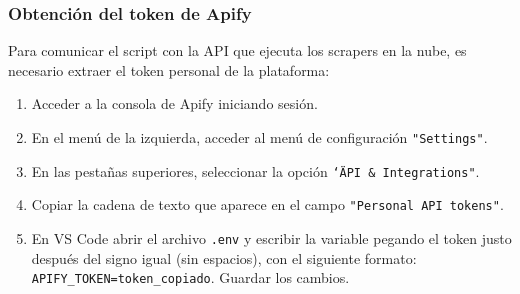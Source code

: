\subsubsection{Obtención del token de Apify}
Para comunicar el script con la API que ejecuta los scrapers en la nube, es necesario extraer el token personal de la plataforma:
\begin{enumerate}
    \item Acceder a la consola de Apify iniciando sesión.
    \item En el menú de la izquierda, acceder al menú de configuración \texttt{"Settings"}.
    \item En las pestañas superiores, seleccionar la opción \texttt{\char`\"API \& Integrations"}.
    \item Copiar la cadena de texto que aparece en el campo \texttt{"Personal API tokens"}.
    \item En VS Code abrir el archivo \texttt{.env} y escribir la variable pegando el token justo después del signo igual (sin espacios), con el siguiente formato: \\
    \texttt{APIFY\_TOKEN=token\_copiado}. Guardar los cambios.
\end{enumerate}

\begin{center}
\end{center}

